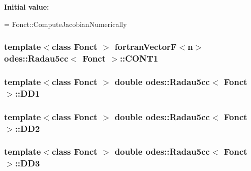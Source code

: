 {\bfseries Initial value\-:}
\begin{DoxyCode}
=
      Fonct::ComputeJacobianNumerically
\end{DoxyCode}
\hypertarget{classodes_1_1Radau5cc_ae99cd8b33b1370b4b2dddb0361d6bb1e}{
\subsubsection[{C\-O\-N\-T1}]{\setlength{\rightskip}{0pt plus 5cm}template$<$class Fonct $>$ {\bf fortran\-Vector\-F}$<${\bf n}$>$ {\bf odes\-::\-Radau5cc}$<$ Fonct $>$\-::C\-O\-N\-T1\hspace{0.3cm}{\ttfamily [private]}}}\label{classodes_1_1Radau5cc_ae99cd8b33b1370b4b2dddb0361d6bb1e}
\hypertarget{classodes_1_1Radau5cc_a9a211ff738351641da6cdd159917fef2}{
\subsubsection[{D\-D1}]{\setlength{\rightskip}{0pt plus 5cm}template$<$class Fonct $>$ double {\bf odes\-::\-Radau5cc}$<$ Fonct $>$\-::D\-D1\hspace{0.3cm}{\ttfamily [private]}}}\label{classodes_1_1Radau5cc_a9a211ff738351641da6cdd159917fef2}
\hypertarget{classodes_1_1Radau5cc_a86933b385c18f7ff7072da61f03daf05}{
\subsubsection[{D\-D2}]{\setlength{\rightskip}{0pt plus 5cm}template$<$class Fonct $>$ double {\bf odes\-::\-Radau5cc}$<$ Fonct $>$\-::D\-D2\hspace{0.3cm}{\ttfamily [private]}}}\label{classodes_1_1Radau5cc_a86933b385c18f7ff7072da61f03daf05}
\hypertarget{classodes_1_1Radau5cc_a1c94a1f803b67e35bbed88d6152d1fff}{
\subsubsection[{D\-D3}]{\setlength{\rightskip}{0pt plus 5cm}template$<$class Fonct $>$ double {\bf odes\-::\-Radau5cc}$<$ Fonct $>$\-::D\-D3\hspace{0.3cm}{\ttfamily [private]}}}\label{classodes_1_1Radau5cc_a1c94a1f803b67e35bbed88d6152d1fff}
